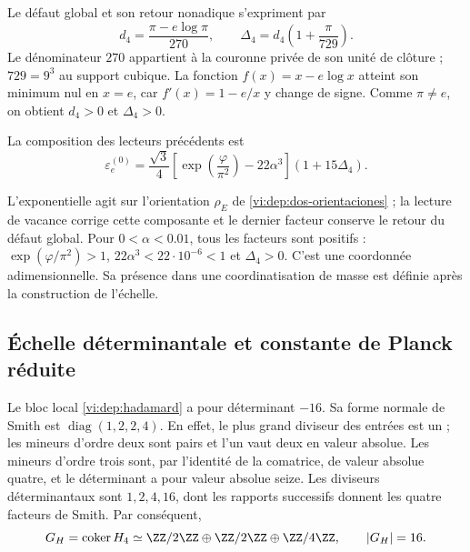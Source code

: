 Le défaut global et son retour nonadique s’expriment par
\begin{equation}
 d_4=\frac{\pi-e\log\pi}{270},\qquad
 \Delta_4=d_4\left(1+\frac{\pi}{729}\right).
 \label{vi:dep:delta4}
\end{equation}
Le dénominateur \(270\) appartient à la couronne privée de son unité de
clôture ; \(729=9^3\) au support cubique. La fonction
\(f(x)=x-e\log x\) atteint son minimum nul en \(x=e\), car
\(f'(x)=1-e/x\) y change de signe. Comme \(\pi\ne e\),
on obtient \(d_4>0\) et \(\Delta_4>0\).

\begin{definition}
\label{vi:dep:electron-basal}
La composition des lecteurs précédents est
\begin{equation}
 \varepsilon_e^{(0)}=
 \frac{\sqrt3}{4}
 \left[\exp\left(\frac{\varphi}{\pi^2}\right)-22\alpha^3\right]
 (1+15\Delta_4).
 \label{vi:dep:formula-basal}
\end{equation}
\end{definition}
L’exponentielle agit sur l’orientation \(\rho_E\) de
\eqref{vi:dep:dos-orientaciones} ; la lecture de vacance corrige cette
composante et le dernier facteur conserve le retour du défaut global.
Pour \(0<\alpha<0.01\), tous les facteurs sont positifs :
\(\exp(\varphi/\pi^2)>1\), \(22\alpha^3<22\cdot10^{-6}<1\)
et \(\Delta_4>0\). C’est une coordonnée adimensionnelle. Sa présence
dans une coordinatisation de masse est définie après la construction de l’échelle.

\subsection{Échelle déterminantale et constante de Planck réduite}
\label{vi:dep:planck}

Le bloc local \eqref{vi:dep:hadamard} a pour déterminant \(-16\).
Sa forme normale de Smith est \(\operatorname{diag}(1,2,2,4)\).
En effet, le plus grand diviseur des entrées est un ; les mineurs
d’ordre deux sont pairs et l’un vaut deux en valeur absolue. Les mineurs
d’ordre trois sont, par l’identité de la comatrice, de valeur absolue quatre,
et le déterminant a pour valeur absolue seize. Les diviseurs
déterminantaux sont \(1,2,4,16\), dont les rapports successifs donnent les
quatre facteurs de Smith. Par conséquent,
\begin{equation}
 G_H=\operatorname{coker}H_4
 \simeq\ZZ/2\ZZ\oplus\ZZ/2\ZZ\oplus\ZZ/4\ZZ,
 \qquad |G_H|=16.
 \label{vi:dep:conucleo}
\end{equation}

